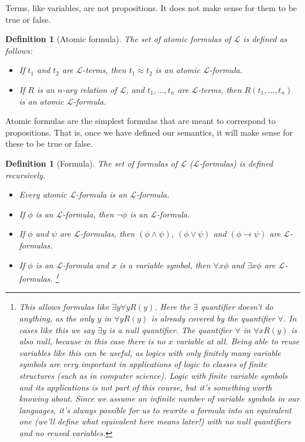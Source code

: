 \documentclass{article}
\theoremstyle{plain}
\newtheorem{definition}[theorem]{Definition}{\bfseries}{\upshape}
\newcommand{\sL}{\mathscr{L}}
\begin{document}
Terms, like variables, are not propositions. It does not make sense for them to be true or false.

\begin{definition}[Atomic formula]
The set of \emph{atomic formulas} of $\sL$ is defined as follows:
\begin{itemize}
\item If $t_1$ and $t_2$ are $\sL$-terms, then $t_1\approx t_2$ is an atomic $\sL$-formula.
\item If $R$ is an $n$-ary relation of $\sL$, and $t_1,\ldots,t_n$ are $\sL$-terms, then $R(t_1,\ldots,t_n)$ is an atomic $\sL$-formula. 
\end{itemize} 
\end{definition} 

Atomic formulas are the simplest formulas that are meant to correspond to propositions. That is, once we have defined our semantics, it will make sense for these to be true or false.

\begin{definition}[Formula]
The set of \emph{formulas} of $\sL$ ($\sL$-formulas) is defined recursively.
\begin{itemize}
\item Every atomic $\sL$-formula is an $\sL$-formula.
\item If $\phi$ is an $\sL$-formula, then $\neg\phi$ is an $\sL$-formula.
\item If $\phi$ and $\psi$ are $\sL$-formulas, then $(\phi\wedge \psi)$, $(\phi\vee\psi)$ and $(\phi\rightarrow \psi)$ are $\sL$-formulas.
\item If $\phi$ is an $\sL$-formula and $x$ is a variable symbol, then $\forall x\phi$ and $\exists x\phi$ are $\sL$-formulas. \footnote{This allows formulas like $\exists y \forall yR(y)$. Here the $\exists$ quantifier doesn't do anything, as the only $y$ in  $\forall yR(y)$ is already covered by the quantifier $\forall$. In cases like this we say $\exists y$ is a \emph{null quantifier}. The quantifier $\forall$ in $\forall x R(y)$ is also null, because in this case there is no $x$ variable at all. Being able to reuse variables like this can be useful, as logics with only finitely many variable symbols are very important in applications of logic to classes of finite structures (such as in computer science). Logic with finite variable symbols and its applications is not part of this course, but it's something worth knowing about. Since we assume an infinite number of variable symbols in our languages, it's always possible for us to rewrite a formula into an equivalent one (we'll define what \emph{equivalent} here means later!) with no null quantifiers and no reused variables.}
\end{itemize} 
\end{definition}
\end{document}
